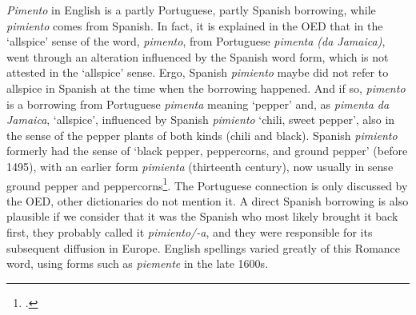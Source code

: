 \textit{Pimento} in English is a partly Portuguese, partly Spanish borrowing, while \textit{pimiento} comes from Spanish. In fact, it is explained in the \gls{OED} that in the `allspice' sense of the word, \textit{pimento}, from Portuguese \textit{pimenta (da Jamaica)}, went through an alteration influenced by the Spanish word form, which is not attested in the `allspice' sense. Ergo, Spanish \textit{pimiento} maybe did not refer to allspice in Spanish at the time when the borrowing happened. And if so, \textit{pimento} is a borrowing from Portuguese \textit{pimenta} meaning `pepper' and, as \textit{pimenta da Jamaica}, `allspice', influenced by Spanish \textit{pimiento} `chili, sweet pepper', also in the sense of the pepper plants of both kinds (chili and black). Spanish \textit{pimiento} formerly had the sense of `black pepper, peppercorns, and ground pepper' (before 1495), with an earlier form \textit{pimienta} (thirteenth century), now usually in sense ground pepper and peppercorns\footcite[pimento]{oed}. The Portuguese connection is only discussed by the \gls{OED}, other dictionaries do not mention it. A direct Spanish borrowing is also plausible if we consider that it was the Spanish who most likely brought it back first, they probably called it \textit{pimiento/-a}, and they were responsible for its subsequent diffusion in Europe. English spellings varied greatly of this Romance word, using forms such as \textit{piemente} in the late 1600s. 

